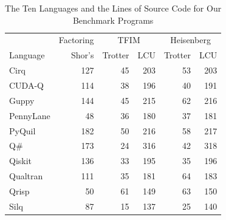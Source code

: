 \begin{table}[t]
  \centering
  \caption{The Ten Languages and the Lines of Source Code for Our Benchmark Programs}
  \label{tab:program-size}
  \begin{tabular}{l|r|rr|rr}
    \toprule
             & Factoring & \multicolumn{2}{c|}{TFIM} & \multicolumn{2}{c}{Heisenberg} \\
    Language & Shor's & Trotter & LCU & Trotter & LCU \\
    \midrule
    Cirq             & 127 & 45 & 203 & 53 & 203 \\
    CUDA-Q           & 114 & 38 & 196 & 40 & 191 \\
    Guppy            & 144 & 45 & 215 & 62 & 216 \\
    PennyLane        & 48 & 36 & 180 & 37 & 181 \\
    PyQuil           & 182 & 50 & 216 & 58 & 217 \\
    Q\#              & 173 & 24 & 316 & 42 & 318 \\
    Qiskit           & 136 & 33 & 195 & 35 & 196 \\
    Qualtran         & 111 & 35 & 181 & 64 & 183 \\
    Qrisp            & 50 & 61 & 149 & 63 & 150 \\
    Silq             & 87 & 15 & 137 & 25 & 140 \\
    \bottomrule
  \end{tabular}
\end{table}
%
